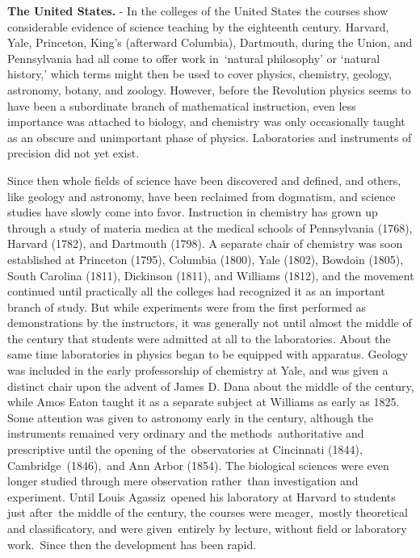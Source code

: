 \documentclass[
]{book}
\begin{document}
\textbf{The United States.} - In the colleges of the United States the courses show considerable evidence of science teaching by the eighteenth century. Harvard, Yale, Princeton, King's (afterward Columbia), Dartmouth, during the Union, and Pennsylvania had all come to offer work in~`natural philosophy' or `natural history,' which terms might then be used to cover physics, chemistry, geology, astronomy, botany, and zoology. However, before the Revolution physics seems to have been a subordinate branch of mathematical instruction, even less importance was attached to biology, and chemistry was only occasionally taught as an obscure and unimportant phase of physics. Laboratories and instruments of precision did not yet exist.

Since then whole fields of science have been discovered and defined, and others, like geology and astronomy, have been reclaimed from dogmatism, and science studies have slowly come into favor. Instruction in chemistry has grown up through a study of materia medica at the medical schools of Pennsylvania (1768), Harvard (1782), and Dartmouth (1798). A separate chair of chemistry was soon established at Princeton (1795), Columbia (1800), Yale (1802), Bowdoin (1805), South Carolina (1811), Dickinson (1811), and Williams (1812), and the movement continued until practically all the colleges had recognized it as an important branch of study. But while experiments were from the first performed as demonstrations by the instructors, it was generally not until almost the middle of the century that students were admitted at all to the laboratories. About the same time laboratories in physics began to be equipped with apparatus. Geology was included in the early professorship of chemistry at Yale, and was given a distinct chair upon the advent of James D. Dana about the middle of the century, while Amos Eaton taught it as a separate subject at Williams as early as 1825. Some attention was given to astronomy early in the century, although the instruments remained very ordinary and the methods~authoritative and prescriptive until the opening of the~observatories at Cincinnati (1844), Cambridge~(1846),~and Ann Arbor (1854). The biological sciences were even longer studied through mere observation rather~than investigation and experiment. Until Louis Agassiz~opened his laboratory at Harvard to students just after~the middle of the century, the courses were meager,~mostly theoretical and classificatory, and were given~entirely by lecture, without field or laboratory work.~Since then the development has been rapid.
\end{document}
